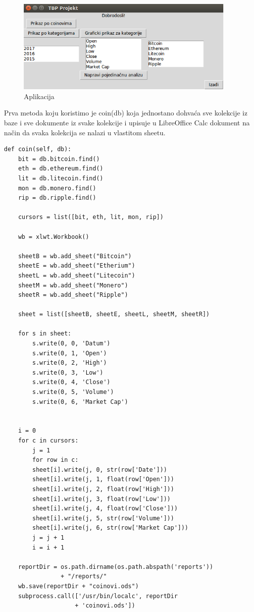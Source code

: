 \documentclass[a4paper,12pt]{foi}
\begin{document}
\begin{figure}[h]
\centering 
\includegraphics[width=0.95\textwidth]{aplikacija.png}
\caption{Aplikacija}
\label{slika-4}
\end{figure}


Prva metoda koju koristimo je coin(db) koja jednostano dohvaća sve kolekcije iz baze i sve dokumente iz svake kolekcije i upisuje u LibreOffice Calc dokument na način da svaka kolekcija se nalazi u vlastitom sheetu.


\lstset{commentstyle=\textit,language=python}
\begin{lstlisting}[frame=tb]
def coin(self, db):
	bit = db.bitcoin.find()
	eth = db.ethereum.find()
	lit = db.litecoin.find()
	mon = db.monero.find()
	rip = db.ripple.find()

	cursors = list([bit, eth, lit, mon, rip])

	wb = xlwt.Workbook()

	sheetB = wb.add_sheet("Bitcoin")
	sheetE = wb.add_sheet("Etherium")
	sheetL = wb.add_sheet("Litecoin")
	sheetM = wb.add_sheet("Monero")
	sheetR = wb.add_sheet("Ripple")

	sheet = list([sheetB, sheetE, sheetL, sheetM, sheetR])

	for s in sheet:
	    s.write(0, 0, 'Datum')
	    s.write(0, 1, 'Open')
	    s.write(0, 2, 'High')
	    s.write(0, 3, 'Low')
	    s.write(0, 4, 'Close')
	    s.write(0, 5, 'Volume')
	    s.write(0, 6, 'Market Cap')


	i = 0
	for c in cursors:
	    j = 1
	    for row in c:
		sheet[i].write(j, 0, str(row['Date']))
		sheet[i].write(j, 1, float(row['Open']))
		sheet[i].write(j, 2, float(row['High']))
		sheet[i].write(j, 3, float(row['Low']))
		sheet[i].write(j, 4, float(row['Close']))
		sheet[i].write(j, 5, str(row['Volume']))
		sheet[i].write(j, 6, str(row['Market Cap']))
		j = j + 1
	    i = i + 1

	reportDir = os.path.dirname(os.path.abspath('reports')) 
				+ "/reports/"
	wb.save(reportDir + "coinovi.ods")
	subprocess.call(['/usr/bin/localc', reportDir 
					+ 'coinovi.ods'])
\end{lstlisting}
\end{document}

